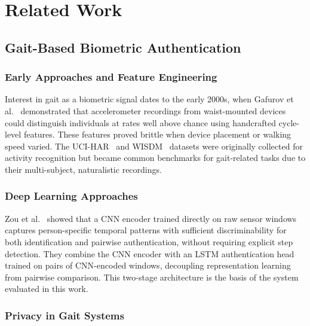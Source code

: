 \chapter{Related Work}
\label{ch:related}

\section{Gait-Based Biometric Authentication}
\label{sec:rel_gait_auth}

\subsection{Early Approaches and Feature Engineering}
\label{ssec:rel_gait_early}

Interest in gait as a biometric signal dates to the early 2000s, when Gafurov et al.~\cite{gafurov2007gait} demonstrated that accelerometer recordings from waist-mounted devices could distinguish individuals at rates well above chance using handcrafted cycle-level features. These features proved brittle when device placement or walking speed varied. The UCI-HAR~\cite{anguita2013human} and WISDM~\cite{weiss2019smartphone} datasets were originally collected for activity recognition but became common benchmarks for gait-related tasks due to their multi-subject, naturalistic recordings.

\subsection{Deep Learning Approaches}
\label{ssec:rel_gait_deep}

Zou et al.~\cite{zou2020deep} showed that a CNN encoder trained directly on raw sensor windows captures person-specific temporal patterns with sufficient discriminability for both identification and pairwise authentication, without requiring explicit step detection. They combine the CNN encoder with an LSTM authentication head trained on pairs of CNN-encoded windows, decoupling representation learning from pairwise comparison. This two-stage architecture is the basis of the system evaluated in this work.

\subsection{Privacy in Gait Systems}
\label{ssec:rel_gait_privacy}

